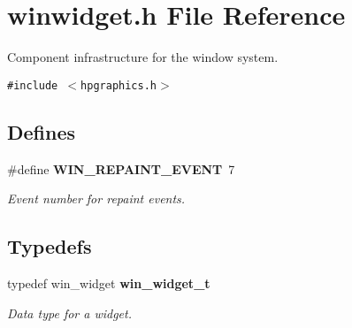 \section{winwidget.h File Reference}
\label{winwidget_8h}
Component infrastructure for the window system. 

{\tt \#include $<$hpgraphics.h$>$}\par
\subsection*{Defines}
\begin{CompactItemize}
\item 
\#define {\bf WIN\_\-REPAINT\_\-EVENT}~7\label{winwidget_8h_a0}

\begin{CompactList}\small\item\em Event number for repaint events. \item\end{CompactList}\end{CompactItemize}
\subsection*{Typedefs}
\begin{CompactItemize}
\item 
typedef win\_\-widget {\bf win\_\-widget\_\-t}
\begin{CompactList}\small\item\em Data type for a widget. \item\end{CompactList}\end{CompactItemize}

